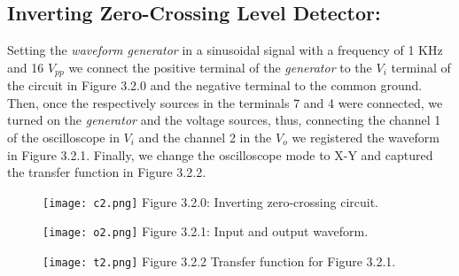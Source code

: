 \subsection{Inverting Zero-Crossing Level Detector:}

Setting the {\itshape waveform generator} in a sinusoidal signal with a frequency of 1 KHz and 16 $V_{pp}$ we connect the positive terminal of the {\itshape generator} to the $V_{i}$ terminal of the circuit in Figure 3.2.0 and the negative terminal to the common ground. Then, once the respectively sources in the terminals 7 and 4 were connected, we turned on the {\itshape generator} and the voltage sources, thus, connecting the channel 1 of the oscilloscope in $V_{i}$ and the channel 2 in the $V_{o}$ we registered the waveform in Figure 3.2.1. Finally, we change the oscilloscope mode to X-Y and captured the transfer function in Figure 3.2.2. \hfill \break

{\bfseries\itshape\color{carmine}{Observation:}} {\itshape{}} \hfill

\begin{figure}[H]
\texttt{[image: c2.png]}
\centering \linebreak \linebreak Figure 3.2.0: Inverting zero-crossing circuit.
\end{figure} \hfill

\begin{multicols}{2}
\begin{figure}[H]
\texttt{[image: o2.png]}
\centering \linebreak \linebreak Figure 3.2.1: Input and output waveform.
\end{figure} \hfill

\begin{figure}[H]
\texttt{[image: t2.png]}
\centering \linebreak \linebreak Figure 3.2.2 Transfer function for Figure 3.2.1.
\end{figure} \hfill
\end{multicols} 

{\bfseries\itshape\color{carmine}{Observation:}} {\itshape\color{carmine}{In Figure 3.2.1 we can see two waveform, the yellow one it's the input of the circuit, analogously, the blue it's for the output.}}

\pagebreak